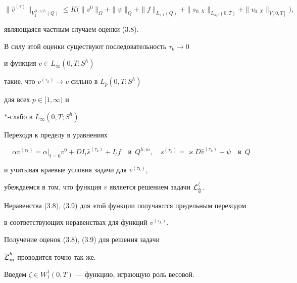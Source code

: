 $$


\|\widehat v^{(\tau)}\|_{V_2^{\langle 1,1/2\rangle}(Q)}\le


K\big(\|v^0\|_\Omega +


\|\psi\|_Q + \|f\|_{L_{2,1}(Q)}


+\|s_{0,X}\|_{L_{4/3}(0,T)}+\|v_{0,X}\|_{V[0,T]}\big),


$$


являющаяся частным случаем оценки (3.8).


В силу этой оценки существуют последовательность $\tau_k\to 0$


и функция $v\in L_\infty(0,T;S^h)$


такие, что $v^{(\tau_k)}\to v$ сильно в $L_p(0,T;S^h)$


для всех $p\in [1,\infty)$ и


$\ast$-слабо в $L_\infty(0,T;S^h)$.


Переходя к пределу в уравнениях


$$


\alpha v^{(\tau_k)}=\alpha|_{t=0}v^0+DI_t\widehat s^{(\tau_k)}+I_tf\quad


\text{в}\ \; Q^{h;m},\quad


s^{(\tau_k)}=\varkappa D\widehat v^{(\tau_k)}-\psi\quad\text{в}\ \; Q


$$


и учитывая краевые условия задачи для $v^{(\tau_k)}$,


убеждаемся в том, что функция $v$ является решением задачи $\cal L^h_m$.


Неравенства (3.8), (3.9) для этой функции получаются предельным переходом


в соответствующих неравенствах для функций $v^{(\tau_k)}$.





Получение оценок (3.8), (3.9) для решения задачи


$\overline{\cal L}_m^h$ проводится точно так же.





Введем $\zeta\in W^1_1(0,T)$ --- функцию, играющую роль весовой.





